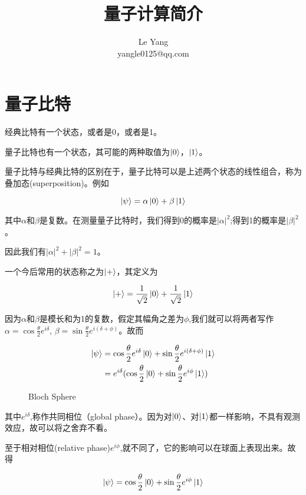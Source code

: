 \documentclass[UTF8]{ctexart}
\begin{document}
\title{量子计算简介}
\author{%
Le Yang\\
yangle0125@qq.com
}
\date{}
\maketitle



\section{量子比特}

经典比特有一个状态，或者是0，或者是1。

量子比特也有一个状态，其可能的两种取值为$\ket{0}$，$\ket{1}$。

量子比特与经典比特的区别在于，量子比特可以是上述两个状态的线性组合，称为叠加态(superposition)。例如

\begin{equation}
\ket{\psi} = \alpha\ket{0} + \beta\ket{1}
\end{equation}

其中$\alpha$和$\beta$是复数。在测量量子比特时，我们得到0的概率是$|\alpha|^2$;得到1的概率是$|\beta|^2$。

因此我们有$|\alpha|^2 + |\beta|^2 = 1$。

一个今后常用的状态称之为$\ket{+}$，其定义为

\begin{equation}
\ket{+} = \frac{1}{\sqrt{2}}\ket{0} + \frac{1}{\sqrt{2}}\ket{1}
\end{equation}

因为$\alpha$和$\beta$是模长和为1的复数，假定其幅角之差为$\phi$,我们就可以将两者写作$\alpha = \cos\frac{\theta}{2}e^{i\delta}$, $\beta = \sin\frac{\theta}{2}e^{i(\delta + \phi)}$。故而

\begin{equation}
\begin{aligned}
\ket{\psi} &= \cos\frac{\theta}{2}e^{i\delta}\ket{0} + \sin\frac{\theta}{2}e^{i(\delta + \phi)}\ket{1} \\
&= e^{i\delta}(\cos\frac{\theta}{2}\ket{0} + \sin\frac{\theta}{2}e^{i\phi}\ket{1})
\end{aligned}
\end{equation}

\begin{figure}
  \centering
  
  \caption{Bloch Sphere}
\end{figure}

其中$e^{i\delta}$,称作共同相位（global phase）。因为对$\ket{0}$、对$\ket{1}$都一样影响，不具有观测效应，故可以将之舍弃不看。

至于相对相位(relative phase)$e^{i\phi}$,就不同了，它的影响可以在球面上表现出来。故得

\begin{equation}
\ket{\psi} = \cos\frac{\theta}{2}\ket{0} + \sin\frac{\theta}{2}e^{i\phi}\ket{1}
\end{equation}
\end{document}
